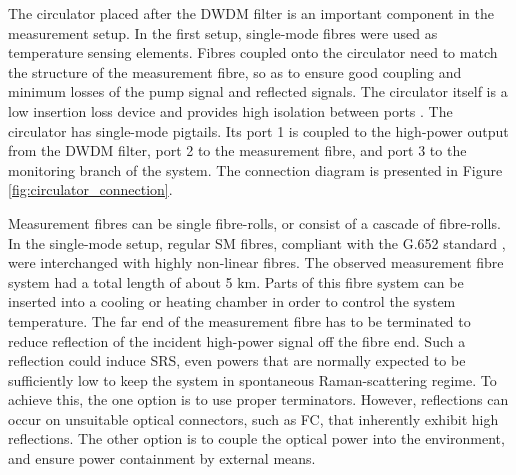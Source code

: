 \documentclass{standalone}
\begin{document}
The circulator placed after the DWDM filter is an important component in the measurement setup. In the first setup, single-mode fibres were used as temperature sensing elements. Fibres coupled onto the circulator need to match the structure of the measurement fibre, so as to ensure good coupling and minimum losses of the pump signal and reflected signals. The circulator itself is a low insertion loss device and provides high isolation between ports \cite{datasheet:smf_circulator}. The circulator has single-mode pigtails. Its port 1 is coupled to the high-power output from the DWDM filter, port 2 to the measurement fibre, and port 3 to the monitoring branch of the system. The connection diagram is presented in Figure \ref{fig:circulator_connection}.

Measurement fibres can be single fibre-rolls, or consist of a cascade of fibre-rolls. In the single-mode setup, regular SM fibres, compliant with the G.652 standard \cite{G652}, were interchanged with highly non-linear fibres. The observed measurement fibre system had a total length of about 5 km. Parts of this fibre system can be inserted into a cooling or heating chamber in order to control the system temperature. The far end of the measurement fibre has to be terminated to reduce reflection of the incident high-power signal off the fibre end. Such a reflection could induce SRS, even powers that are normally expected to be sufficiently low to keep the system in spontaneous Raman-scattering regime. To achieve this, the one option is to use proper terminators. However, reflections can occur on unsuitable optical connectors, such as FC, that inherently exhibit high reflections. The other option is to couple the optical power into the environment, and ensure power containment by external means. \\
\end{document}
